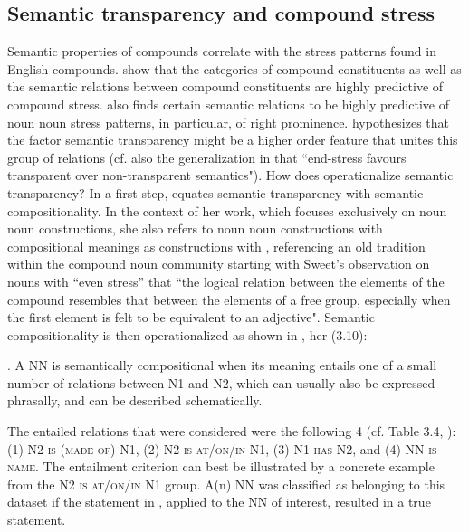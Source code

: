 \subsection{Semantic transparency and compound stress}
\label{sec:semTran-Stress}
Semantic properties of compounds correlate with the stress patterns
found in English compounds. \citet{Plagetal:2008} show that the
categories of compound constituents as well as the semantic relations
between compound constituents are
highly predictive of compound stress. 
\citet{Bell:2012} also finds certain semantic relations to be highly
predictive of noun noun stress patterns, in particular, of right prominence. \citet[49--51]{Bell:2012} hypothesizes that the factor semantic transparency
might be a higher order feature that unites this group of
relations (cf. also the generalization in \citealt[6]{Giegerich:2009}
that ``end-stress favours transparent over non-transparent semantics"). How does \citet{Bell:2012} operationalize semantic
transparency? In a first step, \citet{Bell:2012} equates semantic transparency with
semantic compositionality. In the context of her work, which
focuses exclusively on noun noun constructions, she also refers to noun noun constructions
with compositional meanings as constructions with , referencing an old tradition within the compound noun
community starting with Sweet's \citeyearpar[288]{Sweet:1891} observation
on nouns with ``even stress'' that ``the logical relation between the elements of the compound
resembles that between the elements of a free group, especially when
the first element is felt to be equivalent to an adjective". Semantic compositionality is then
operationalized as shown in \Next, her (3.10):

\ex. A NN is semantically compositional when its meaning entails one of a
small number of relations between N1 and N2, which can usually also
be expressed phrasally, and can be described schematically. 

The entailed relations that were considered were the following 4
(cf. Table 3.4, \citealt[65]{Bell:2012}): (1) N2 \textsc{is (made of)} N1, (2) N2 \textsc{is at/on/in} N1,
(3) N1 \textsc{has} N2, and (4) NN \textsc{is name}.
The entailment criterion can best be illustrated by a concrete example
from the N2 \textsc{is at/on/in} N1 group. A(n) NN was classified as belonging to
this dataset if the statement in \Next, applied to the NN of interest,
resulted in a true statement.

